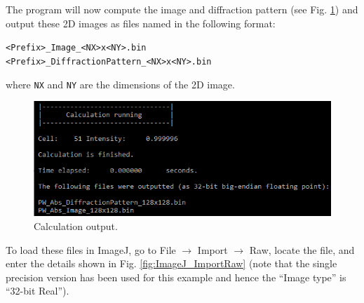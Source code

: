 \documentclass[12pt,a4paper]{article}
\newenvironment{myenv}{\begin{samepage}\begin{adjustwidth}{2cm}{}}{\end{adjustwidth}\end{samepage}}
\begin{document}
The program will now compute the image and diffraction pattern (see Fig. \ref{fig:pw_abs_calc}) and output these 2D images as files named in the following format:
%
\begin{myenv}
    \verb|<Prefix>_Image_<NX>x<NY>.bin| \\
    \verb|<Prefix>_DiffractionPattern_<NX>x<NY>.bin|
\end{myenv}
%
where \verb|NX| and \verb|NY| are the dimensions of the 2D image.

\begin{figure}[!h]
\begin{center}
    \includegraphics[scale=0.75]{figures/pw_abs_calc.png}
\caption{Calculation output.}
\label{fig:pw_abs_calc}
\end{center}
\end{figure}

To load these files in ImageJ, go to File $\rightarrow$ Import $\rightarrow$ Raw, locate the file, and enter the details shown in Fig. \ref{fig:ImageJ_ImportRaw} (note that the single precision version has been used for this example and hence the ``Image type'' is ``32-bit Real'').
\end{document}
